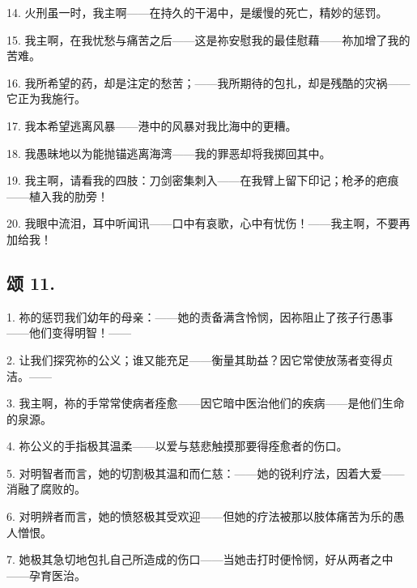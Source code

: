 14. 火刑虽一时，我主啊——在持久的干渴中，是缓慢的死亡，精妙的惩罚。\par

15. 我主啊，在我忧愁与痛苦之后——这是祢安慰我的最佳慰藉——祢加增了我的苦难。\par

16. 我所希望的药，却是注定的愁苦；——我所期待的包扎，却是残酷的灾祸——它正为我施行。\par

17. 我本希望逃离风暴——港中的风暴对我比海中的更糟。\par

18. 我愚昧地以为能抛锚逃离海湾——我的罪恶却将我掷回其中。\par

19. 我主啊，请看我的四肢：刀剑密集刺入——在我臂上留下印记；枪矛的疤痕——植入我的肋旁！\par

20. 我眼中流泪，耳中听闻讯——口中有哀歌，心中有忧伤！——我主啊，不要再加给我！\par


\subsection{颂 11.}

1. 祢的惩罚我们幼年的母亲：——她的责备满含怜悯，因祢阻止了孩子行愚事——他们变得明智！——\par

2. 让我们探究祢的公义；谁又能充足——衡量其助益？因它常使放荡者变得贞洁。——\par

3. 我主啊，祢的手常常使病者痊愈——因它暗中医治他们的疾病——是他们生命的泉源。\par

4. 祢公义的手指极其温柔——以爱与慈悲触摸那要得痊愈者的伤口。\par

5. 对明智者而言，她的切割极其温和而仁慈：——她的锐利疗法，因着大爱——消融了腐败的。\par

6. 对明辨者而言，她的愤怒极其受欢迎——但她的疗法被那以肢体痛苦为乐的愚人憎恨。\par

7. 她极其急切地包扎自己所造成的伤口——当她击打时便怜悯，好从两者之中——孕育医治。\par

